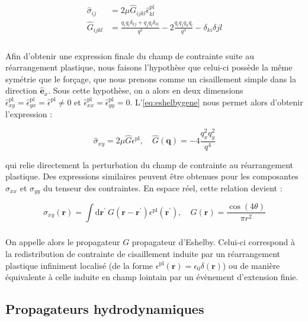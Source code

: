 \begin{equation}
\begin{aligned}
	\hat{\sigma}_{ij} &= 2\mu \hat{G}_{ijkl}\hat{\epsilon}_{kl}^\text{pl}\\
	\hat{G}_{ijkl} &= \frac{q_i q_l\delta_{kj}+q_j q_l\delta_{ki}}{q^2}-2\frac{q_iq_jq_kq_l}{q^4}-\delta_{ki}\delta{jl}
\end{aligned}
\label{eq:eshelbygene}
\end{equation}

\subparagraph{}Afin d'obtenir une expression finale du champ de contrainte suite au réarrangement plastique, nous faisons l'hypothèse que celui-ci possède la même symétrie que le forçage, que nous prenons comme un cisaillement simple dans la direction $\hat{\mathbf{e}}_x$. Sous cette hypothèse, on a alors en deux dimensions $\hat{\epsilon}_{xy}^\text{pl} = \hat{\epsilon}_{yx}^\text{pl} = \hat{\epsilon}^\text{pl} \neq 0$ et $\hat{\epsilon}_{xx}^\text{pl} = \hat{\epsilon}_{yy}^\text{pl} = 0$. L'\autoref{eq:eshelbygene} nous permet alors d'obtenir l'expression :

\begin{equation}
	\hat{\sigma}_{xy} = 2\mu \hat{G} \epsilon^\text{pl}, \quad \hat{G}(\mathbf{q}) = -4\frac{q_x^2q_y^2}{q^4}
\end{equation}

\noindent qui relie directement la perturbation du champ de contrainte au réarrangement plastique. Des expressions similaires peuvent être obtenues pour les composantes $\sigma_{xx}$ et $\sigma_{yy}$ du tenseur des contraintes. En espace réel, cette relation devient :

\begin{equation}
	\sigma_{xy}(\mathbf{r}) = \int\mathrm{d}\mathbf{r}^\prime~G(\mathbf{r}-\mathbf{r}^\prime)\epsilon^\text{pl}(\mathbf{r}^\prime), \quad G(\mathbf{r}) = \frac{\cos (4\theta)}{\pi r^2}
	\label{eq:EshelbyReel}
\end{equation}

\subparagraph{}On appelle alors le propagateur $G$ propagateur d'Eshelby. Celui-ci correspond à la redistribution de contrainte de cisaillement induite par un réarrangement plastique infiniment localisé (de la forme $\epsilon^\text{pl}(\mathbf{r}) = \epsilon_0 \delta (\mathbf{r})$) ou de manière équivalente à celle induite en champ lointain par un évènement d'extension finie.

\subsection{Propagateurs hydrodynamiques}

